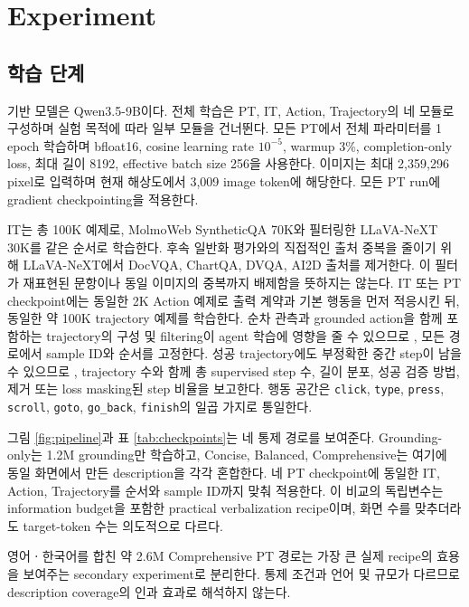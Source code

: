 \section{Experiment}

\subsection{학습 단계}

기반 모델은 Qwen3.5-9B이다. 전체 학습은 PT, IT, Action,
Trajectory의 네 모듈로 구성하며 실험 목적에 따라 일부 모듈을
건너뛴다. 모든 PT에서 전체 파라미터를 1 epoch 학습하며 bfloat16,
cosine learning rate $10^{-5}$, warmup 3\%, completion-only loss,
최대 길이 8192, effective batch size 256을 사용한다. 이미지는 최대
2,359,296 pixel로 입력하며 현재 해상도에서 3,009 image token에
해당한다. 모든 PT run에 gradient checkpointing을 적용한다.

IT는 총 100K 예제로, MolmoWeb SyntheticQA 70K와 필터링한
LLaVA-NeXT 30K를 같은 순서로 학습한다. 후속 일반화 평가와의
직접적인 출처 중복을 줄이기 위해 LLaVA-NeXT에서 DocVQA, ChartQA,
DVQA, AI2D 출처를 제거한다. 이 필터가 재표현된 문항이나 동일
이미지의 중복까지 배제함을 뜻하지는 않는다. IT 또는 PT
checkpoint에는 동일한 2K Action
예제로 출력 계약과 기본 행동을 먼저 적응시킨 뒤, 동일한 약 100K
trajectory 예제를 학습한다. 순차 관측과 grounded action을 함께
포함하는 trajectory의 구성 및 filtering이 agent 학습에 영향을
줄 수 있으므로 \citep{xu2025agenttrek,gupta2026molmoweb}, 모든
경로에서 sample ID와 순서를 고정한다. 성공 trajectory에도
부정확한 중간 step이 남을 수 있으므로 \citep{he2026webstar},
trajectory 수와 함께 총 supervised step 수, 길이 분포, 성공 검증
방법, 제거 또는 loss masking된 step 비율을 보고한다. 행동 공간은 \texttt{click},
\texttt{type}, \texttt{press}, \texttt{scroll}, \texttt{goto},
\texttt{go\_back}, \texttt{finish}의 일곱 가지로 통일한다.



그림 \ref{fig:pipeline}과 표 \ref{tab:checkpoints}는 네 통제 경로를
보여준다. Grounding-only는 1.2M grounding만 학습하고, Concise,
Balanced, Comprehensive는 여기에 동일 화면에서 만든 description을
각각 혼합한다. 네 PT checkpoint에 동일한 IT, Action, Trajectory를
순서와 sample ID까지 맞춰 적용한다. 이 비교의 독립변수는
information budget을 포함한 practical verbalization recipe이며,
화면 수를 맞추더라도 target-token 수는 의도적으로 다르다.

영어ㆍ한국어를 합친 약 2.6M Comprehensive PT 경로는 가장 큰 실제
recipe의 효용을 보여주는 secondary experiment로 분리한다. 통제
조건과 언어 및 규모가 다르므로 description coverage의 인과 효과로
해석하지 않는다.

